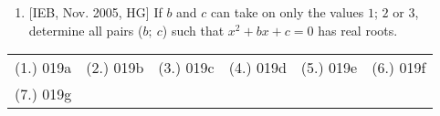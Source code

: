 {{\begin{enumerate}
\item{[IEB, Nov. 2005, HG] If $b$ and $c$ can take on only the values $1$; $2$ or $3$, determine all pairs ($b; \: c$) such that $x^2+bx+c=0$ has real roots.}
\end{enumerate}


\par \practiceinfo
\par \begin{tabular}[h]{cccccc}
(1.)	019a	&
(2.)	019b	&
(3.)	019c	&
(4.)	019d	&
(5.)	019e	&
(6.)	019f	\\ %
(7.)	019g	&
\end{tabular}}}

